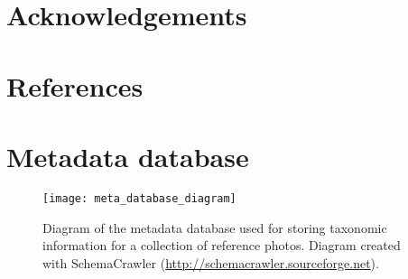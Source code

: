 \documentclass[3p,twocolumn,10pt]{elsarticle}
\begin{document}
\lipsum[1]

\section*{Acknowledgements}


\lipsum[1]



\section*{References}

%

%






%

%




\appendix
\onecolumn

\section{Metadata database}
\label{sect:meta-database}

\begin{figure*}[!h]
    \centering
    \texttt{[image: meta\_database\_diagram]}
    \caption{Diagram of the metadata database used for storing taxonomic information for a collection of reference photos. Diagram created with SchemaCrawler (\url{http://schemacrawler.sourceforge.net}).}
    \label{fig:meta-database}
\end{figure*}
\end{document}

